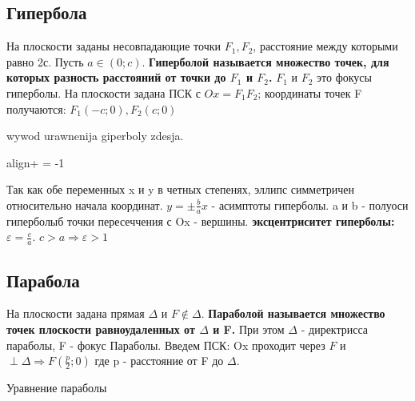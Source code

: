 \documentclass[oneside]{book}
\newcommand{\boxedeq}[2]{\begin{empheq}[box={\fboxsep=6pt\fbox}]{align}\label{#1}#2\end{empheq}}
\begin{document}
\begin{enumerate}
\subsection{Гипербола}
На плоскости заданы несовпадающие точки $F_1, F_2$, расстояние между которыми равно 2с. Пусть $a \in (0; c)$.
\textbf{Гиперболой называется множество точек, для которых разность расстояний от точки до $F_1$ и $F_2$.} $F_1$ и $F_2$ это
фокусы гиперболы. На плоскости задана ПСК с $Ox = F_1F_2$; координаты точек F получаются: $F_1(-c; 0), F_2(c; 0)$
\begin{center}
    \tikzset{>=stealth}

    wywod urawnenija giperboly zdesja.

    \boxedeq{eq:*}{+ = -1}

\end{center}
Так как обе переменных x и y в четных степенях, эллипс симметричен относительно начала координат.
$y = \pm\frac{b}{a}x$ - асимптоты гиперболы. a и b - полуоси гиперболыб точки пересеччения с Ox - вершины.
\textbf{эксцентриситет гиперболы: $\varepsilon = \frac{c}{a}$}. $c > a \Rightarrow \varepsilon >1$

\subsection{Парабола}
На плоскости задана прямая $\Delta$ и $F \notin \Delta$. \textbf{Параболой называется множество точек плоскости
равноудаленных от $\Delta$ и F.} При этом $\Delta$ - директрисса параболы, F - фокус Параболы. Введем ПСК:
Ox проходит через $F$ и $\perp \Delta \Rightarrow F(\frac{p}{2}; 0)$ где p - расстояние от F до $\Delta$.
\begin{center}
    Уравнение параболы


\end{center}
\end{enumerate}
\end{document}
